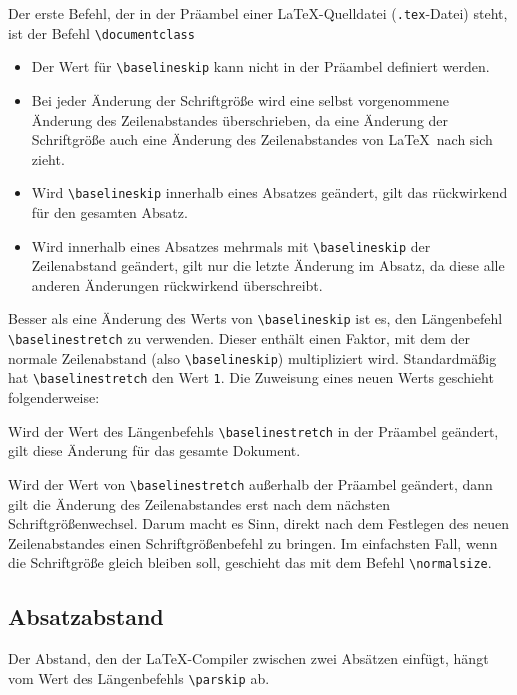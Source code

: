 Der erste Befehl, der in der Präambel einer \LaTeX-Quelldatei (\verb!.tex!-Datei) steht, ist der Befehl \verb!\documentclass!
\begin{document}
\begin{itemize}
\item Der Wert für \verb!\baselineskip! 
kann nicht in der Präambel definiert werden.
\item Bei jeder Änderung der Schriftgröße wird 
eine selbst vorgenommene Änderung des Zeilenabstandes
überschrieben, da eine Änderung der 
Schriftgröße auch eine Änderung des
Zeilenabstandes von \LaTeX\ nach sich zieht.
\item Wird \verb!\baselineskip! innerhalb 
eines Absatzes geändert, gilt
das rückwirkend für den gesamten Absatz.
\item Wird innerhalb eines Absatzes 
mehrmals mit \verb!\baselineskip!
der Zeilenabstand geändert, gilt nur die 
letzte Änderung im Absatz, da diese alle anderen Änderungen rückwirkend überschreibt.
\end{itemize}

Besser als eine Änderung des Werts von \verb!\baselineskip! ist es, den Längenbefehl 
\verb!\baselinestretch! zu verwenden. Dieser enthält
einen Faktor, mit 
dem der normale
Zeilenabstand (also \verb!\baselineskip!)
multipliziert wird. 
Standardmäßig hat \verb!\baselinestretch!
den Wert \verb!1!. Die Zuweisung eines neuen Werts geschieht folgenderweise:


Wird der Wert des Längenbefehls \verb!\baselinestretch! 
in der Präambel geändert, gilt
diese Änderung für das gesamte Dokument.

Wird der Wert von \verb!\baselinestretch! außerhalb der Präambel geändert, dann gilt die Änderung des Zeilenabstandes erst nach dem nächsten 
Schriftgrößenwechsel. Darum macht es 
Sinn, direkt nach dem Festlegen des neuen 
Zeilenabstandes einen Schriftgrößenbefehl 
zu bringen. Im einfachsten Fall, wenn die Schriftgröße gleich bleiben soll, geschieht das mit dem Befehl \verb!\normalsize!.



\subsection{Absatzabstand}
\label{Absatzabstand}

Der Abstand, den der \LaTeX-Compiler zwischen zwei Absätzen einfügt, hängt vom Wert des 
Längenbefehls \verb!\parskip! ab. 
\end{document}
